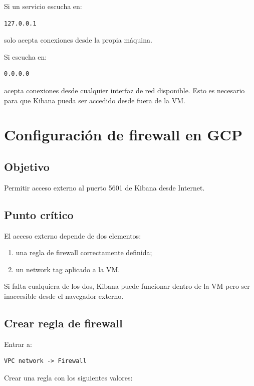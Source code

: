 \documentclass[
  coursetitle={Cómputo Nube y Tecnologías Emergentes},
  coursehours={96},
  coursedate={Verano 2026},
  doctype={Laboratorio},
  otherlangs={english,french},
  authorname={Lázaro},
  authorsurname={Bustio-Martínez},
  authortitle={PhD},
  role={Profesor Investigador},
  email={lbustio@inaoe.mx},
  phone={5559504000},
  ext={7459},
  institution={Instituto Nacional de Astrofísica, Óptica y Electrónica (INAOE)},
  department={Maestría en Ciencias en Tecnologías de Seguridad},
  address={Luis Enrique Erro 1, Sta. Ma. Tonantzintla, San Andrés Cholula, CP 72840, Puebla, México},
  margin={0.5in}
]{../../lbustio_lecture_notes}
\begin{document}
Si un servicio escucha en:

\begin{verbatim}
127.0.0.1
\end{verbatim}

solo acepta conexiones desde la propia máquina.

Si escucha en:

\begin{verbatim}
0.0.0.0
\end{verbatim}

acepta conexiones desde cualquier interfaz de red disponible. Esto es necesario para que Kibana pueda ser accedido desde fuera de la VM.

\section{Configuración de firewall en GCP}

\subsection{Objetivo}

Permitir acceso externo al puerto 5601 de Kibana desde Internet.

\subsection{Punto crítico}

El acceso externo depende de dos elementos:

\begin{enumerate}
    \item una regla de firewall correctamente definida;
    \item un network tag aplicado a la VM.
\end{enumerate}

Si falta cualquiera de los dos, Kibana puede funcionar dentro de la VM pero ser inaccesible desde el navegador externo.

\subsection{Crear regla de firewall}

Entrar a:

\begin{verbatim}
VPC network -> Firewall
\end{verbatim}

Crear una regla con los siguientes valores:
\end{document}
